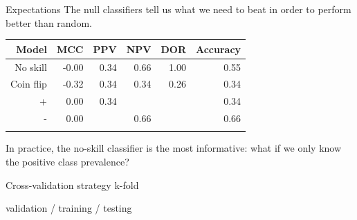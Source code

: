 \documentclass[12pt, smalloffset, compress, aspectratio=1610]{beamer}
\begin{document}
\begin{frame}{Expectations}
\label{expectations}
The null classifiers tell us what we need to beat in order to perform
\alert{better than
random}.

\begin{longtable}[]{@{}rrrrrr@{}}
\toprule\noalign{}
\textbf{Model} & \textbf{MCC} & \textbf{PPV} & \textbf{NPV} &
\textbf{DOR} & \textbf{Accuracy} \\
\midrule\noalign{}
\endhead
No skill & -0.00 & 0.34 & 0.66 & 1.00 & 0.55 \\
Coin flip & -0.32 & 0.34 & 0.34 & 0.26 & 0.34 \\
+ & 0.00 & 0.34 & & & 0.34 \\
- & 0.00 & & 0.66 & & 0.66 \\
\bottomrule\noalign{}
\end{longtable}

In practice, the no-skill classifier is the most informative: what if we
\alert{only} know the positive class prevalence?
\end{frame}

\begin{frame}{Cross-validation strategy}
\label{cross-validation-strategy}
k-fold

validation / training / testing
\end{frame}
\end{document}
